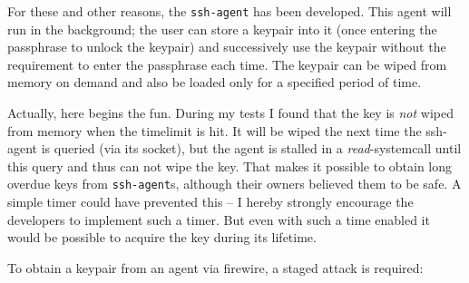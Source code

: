 For these and other reasons, the \texttt{ssh-agent} has been developed. This
agent will run in the background; the user can store a keypair into it (once
entering the passphrase to unlock the keypair) and successively use the keypair
without the requirement to enter the passphrase each time. The keypair can be
wiped from memory on demand and also be loaded only for a specified period of
time.

Actually, here begins the fun. During my tests I found that the key is
\emph{not} wiped from memory when the timelimit is hit. It will be wiped the
next time the ssh-agent is queried (via its socket), but the agent is stalled in
a \emph{read}-systemcall until this query and thus can not wipe the key. That
makes it possible to obtain long overdue keys from \texttt{ssh-agent}s, although
their owners believed them to be safe. A simple timer could have prevented this
-- I hereby strongly encourage the developers to implement such a timer. But
even with such a time enabled it would be possible to acquire the key during its
lifetime.

To obtain a keypair from an agent via firewire, a staged attack is required:

